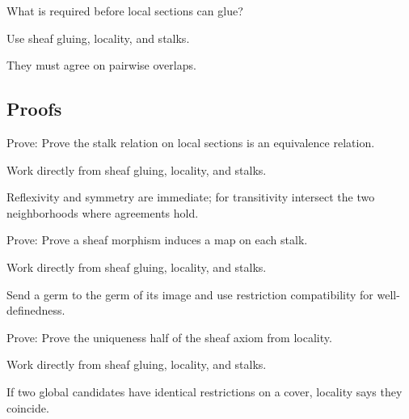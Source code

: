 \begin{exercise}[Gluing]\label{exr:vi13-expand-05}
What is required before local sections can glue?
\end{exercise}
\begin{hint}
Use sheaf gluing, locality, and stalks.
\end{hint}
\begin{solution}
They must agree on pairwise overlaps.
\end{solution}

\subsection*{Proofs}

\begin{exercise}\label{exr:vi13-expand-06}
Prove: Prove the stalk relation on local sections is an equivalence relation.
\end{exercise}
\begin{hint}
Work directly from sheaf gluing, locality, and stalks.
\end{hint}
\begin{solution}
Reflexivity and symmetry are immediate; for transitivity intersect the two neighborhoods where agreements hold.
\end{solution}

\begin{exercise}\label{exr:vi13-expand-07}
Prove: Prove a sheaf morphism induces a map on each stalk.
\end{exercise}
\begin{hint}
Work directly from sheaf gluing, locality, and stalks.
\end{hint}
\begin{solution}
Send a germ to the germ of its image and use restriction compatibility for well-definedness.
\end{solution}

\begin{exercise}[Uniqueness]\label{exr:vi13-expand-08}
Prove: Prove the uniqueness half of the sheaf axiom from locality.
\end{exercise}
\begin{hint}
Work directly from sheaf gluing, locality, and stalks.
\end{hint}
\begin{solution}
If two global candidates have identical restrictions on a cover, locality says they coincide.
\end{solution}

